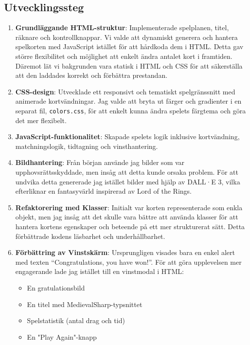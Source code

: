 \documentclass[a4paper,12pt]{article}
\begin{document}
\subsection*{Utvecklingssteg}
\begin{enumerate}
    \item \textbf{Grundläggande HTML-struktur}: Implementerade spelplanen, titel, räknare och kontrollknappar. Vi valde att dynamiskt generera och hantera spelkorten med JavaScript istället för att hårdkoda dem i HTML. Detta gav större flexibilitet och möjlighet att enkelt ändra antalet kort i framtiden. Däremot lät vi bakgrunden vara statisk i HTML och CSS för att säkerställa att den laddades korrekt och förbättra prestandan.
    \item \textbf{CSS-design}: Utvecklade ett responsivt och tematiskt spelgränssnitt med animerade kortvändningar. Jag valde att bryta ut färger och gradienter i en separat fil, \texttt{colors.css}, för att enkelt kunna ändra spelets färgtema och göra det mer flexibelt.
    \item \textbf{JavaScript-funktionalitet}: Skapade spelets logik inklusive kortvändning, matchningslogik, tidtagning och vinsthantering.
    \item \textbf{Bildhantering}: Från början använde jag bilder som var upphovsrättsskyddade, men insåg att detta kunde orsaka problem. För att undvika detta genererade jag istället bilder med hjälp av DALL·E 3, vilka efterliknar en fantasyvärld inspirerad av Lord of the Rings.
    \item \textbf{Refaktorering med Klasser}: Initialt var korten representerade som enkla objekt, men jag insåg att det skulle vara bättre att använda klasser för att hantera kortens egenskaper och beteende på ett mer strukturerat sätt. Detta förbättrade kodens läsbarhet och underhållbarhet.
    \item \textbf{Förbättring av Vinstskärm}: Ursprungligen visades bara en enkel alert med texten “Congratulations, you have won!”. För att göra upplevelsen mer engagerande lade jag istället till en vinstmodal i HTML:
    \begin{itemize}
        \item En gratulationsbild
        \item En titel med MedievalSharp-typsnittet
        \item Spelstatistik (antal drag och tid)
        \item En "Play Again"-knapp
    \end{itemize}
    

\end{enumerate}
\end{document}

